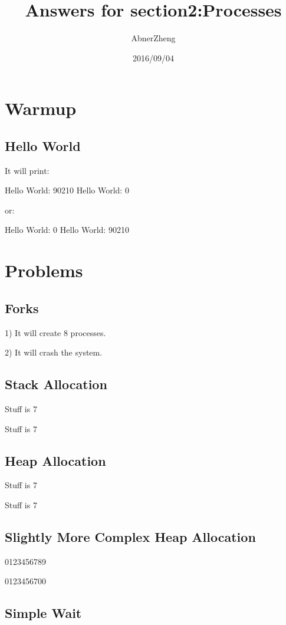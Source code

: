 \documentclass[utf-8]{ctexart}
\begin{document}
\author{AbnerZheng}
\title{Answers for section2:Processes}
\date{2016/09/04}
\maketitle{}
\section{Warmup}
\label{sec:warmup}

\subsection{Hello World}
\label{sec:1.1}
It will print:

Hello World: 90210
Hello World: 0

or:

Hello World: 0
Hello World: 90210

\section{Problems}
\label{sec:3}

\subsection{Forks}
\label{sec:3.1}

1) It will create 8 processes.

2) It will crash the system.

\subsection{Stack Allocation}
\label{sec:3.2}

Stuff is 7

Stuff is 7

\subsection{Heap Allocation}
\label{sec:3.3}
Stuff is 7

Stuff is 7

\subsection{Slightly More Complex Heap Allocation}
\label{sec:3.4}

0123456789

0123456700

\subsection{Simple Wait}
\label{sec:3.5}
\end{document}
